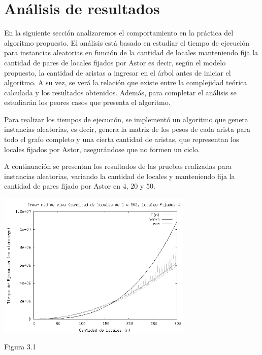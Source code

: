 \documentclass[a4paper,11pt] {article}
\begin{document}
\section*{An\'alisis de resultados}

En la siguiente secci\'on analizaremos el comportamiento en la pr\'actica del algoritmo propuesto. El an\'alisis est\'a basado en estudiar el tiempo de ejecuci\'on para instancias aleatorias en funci\'on de la cantidad de locales manteniendo fija la cantidad de pares de locales fijados por Astor es decir, seg\'un el modelo propuesto, la cantidad de aristas a ingresar en el \'arbol antes de iniciar el algoritmo. A su vez, se ver\'a la relaci\'on que existe entre la complejidad te\'orica calculada y los resultados obtenidos. Adem\'as, para completar el an\'alisis se estudiar\'an los peores casos que presenta el algoritmo.

Para realizar los tiempos de ejecuci\'on, se implement\'o un algoritmo que genera instancias aleatorias, es decir, genera la matriz de los pesos de cada arista para todo el grafo completo y una cierta cantidad de aristas, que representan los locales fijados por Astor, asegur\'andose que no formen un ciclo.

A continuaci\'on se presentan los resultados de las pruebas realizadas para instancias aleatorias, variando la cantidad de locales y manteniendo fija la cantidad de pares fijado por Astor en $4$, $20$ y $50$.

\begin{center}
 \includegraphics[width=0.7\textwidth]{Plots/Tp2Ej3-Complejidad.png}
\begin{center}
Figura 3.1
\end{center}
\end{center}
\end{document}
